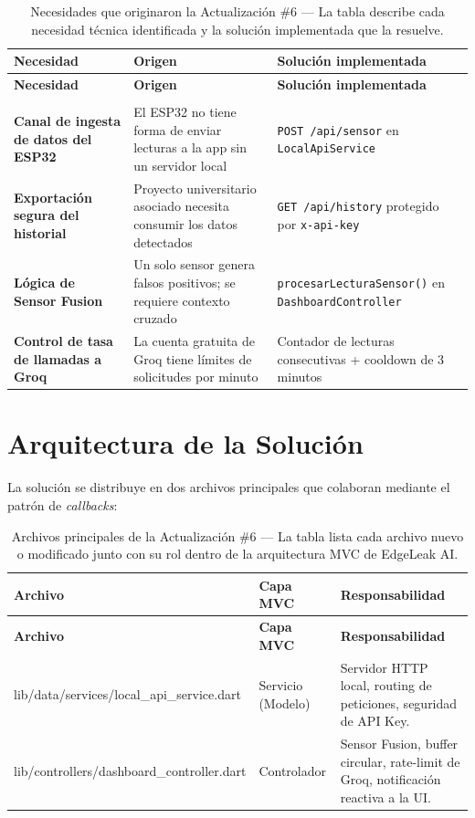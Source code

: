 \documentclass[12pt,a4paper]{article}
\begin{document}
\begin{longtable}{>{\bfseries}p{3cm} p{4cm} p{6.5cm}}
\caption{Necesidades que originaron la Actualización \#6 --- La tabla describe cada
  necesidad técnica identificada y la solución implementada que la resuelve.}
\label{tab:necesidades} \\
\toprule
\textbf{Necesidad} & \textbf{Origen} & \textbf{Solución implementada} \\
\midrule
\endfirsthead
\toprule
\textbf{Necesidad} & \textbf{Origen} & \textbf{Solución implementada} \\
\midrule
\endhead
\midrule
\multicolumn{3}{r}{\small Continúa en la siguiente página\ldots} \\
\endfoot
\bottomrule
\endlastfoot
Canal de ingesta de datos del ESP32 &
  El ESP32 no tiene forma de enviar lecturas a la app sin un servidor local &
  \texttt{POST /api/sensor} en \texttt{LocalApiService} \\[0.5em]
Exportación segura del historial &
  Proyecto universitario asociado necesita consumir los datos detectados &
  \texttt{GET /api/history} protegido por \texttt{x-api-key} \\[0.5em]
Lógica de Sensor Fusion &
  Un solo sensor genera falsos positivos; se requiere contexto cruzado &
  \texttt{procesarLecturaSensor()} en \texttt{DashboardController} \\[0.5em]
Control de tasa de llamadas a Groq &
  La cuenta gratuita de Groq tiene límites de solicitudes por minuto &
  Contador de lecturas consecutivas + cooldown de 3 minutos \\
\end{longtable}

\section{Arquitectura de la Solución}

La solución se distribuye en dos archivos principales que colaboran mediante el patrón
de \emph{callbacks}:

\begin{longtable}{>{\ttfamily}p{6cm} p{2.5cm} p{5.5cm}}
\caption{Archivos principales de la Actualización \#6 --- La tabla lista cada archivo
  nuevo o modificado junto con su rol dentro de la arquitectura MVC de EdgeLeak AI.}
\label{tab:archivos-arch} \\
\toprule
\textbf{Archivo} & \textbf{Capa MVC} & \textbf{Responsabilidad} \\
\midrule
\endfirsthead
\toprule
\textbf{Archivo} & \textbf{Capa MVC} & \textbf{Responsabilidad} \\
\midrule
\endhead
\bottomrule
\endlastfoot
lib/data/services/local\_api\_service.dart & Servicio (Modelo) &
  Servidor HTTP local, routing de peticiones, seguridad de API Key. \\[0.5em]
lib/controllers/dashboard\_controller.dart & Controlador &
  Sensor Fusion, buffer circular, rate-limit de Groq, notificación reactiva a la UI. \\
\end{longtable}
\end{document}
